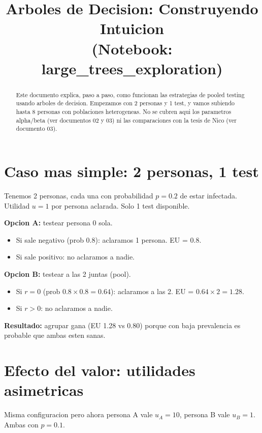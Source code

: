 \documentclass[11pt]{article}
\title{Arboles de Decision: Construyendo Intuicion\\
\large (Notebook: large\_trees\_exploration)}
\author{}
\date{}
\begin{document}
\maketitle

\begin{abstract}
Este documento explica, paso a paso, como funcionan las estrategias de
pooled testing usando arboles de decision.
Empezamos con 2 personas y 1 test, y vamos subiendo hasta 8 personas
con poblaciones heterogeneas.
No se cubren aqui los parametros alpha/beta (ver documentos 02 y 03)
ni las comparaciones con la tesis de Nico (ver documento 03).
\end{abstract}

\section{Caso mas simple: 2 personas, 1 test}

Tenemos 2 personas, cada una con probabilidad $p=0.2$ de estar infectada.
Utilidad $u=1$ por persona aclarada. Solo 1 test disponible.

\textbf{Opcion A:} testear persona 0 sola.
\begin{itemize}
  \item Si sale negativo (prob 0.8): aclaramos 1 persona. EU = 0.8.
  \item Si sale positivo: no aclaramos a nadie.
\end{itemize}

\textbf{Opcion B:} testear a las 2 juntas (pool).
\begin{itemize}
  \item Si $r=0$ (prob $0.8 \times 0.8 = 0.64$): aclaramos a las 2. EU = $0.64 \times 2 = 1.28$.
  \item Si $r>0$: no aclaramos a nadie.
\end{itemize}

\textbf{Resultado:} agrupar gana (EU 1.28 vs 0.80) porque con baja prevalencia
es probable que ambas esten sanas.

\section{Efecto del valor: utilidades asimetricas}

Misma configuracion pero ahora persona A vale $u_A = 10$, persona B vale $u_B = 1$.
Ambas con $p = 0.1$.
\end{document}
